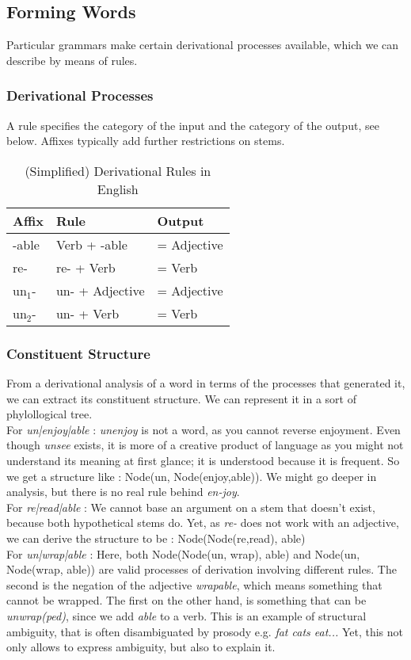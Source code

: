 \documentclass{cours}
\begin{document}
\subsection{Forming Words}
Particular grammars make certain derivational processes available, which we can describe by means of rules.

\subsubsection{Derivational Processes}
A rule specifies the category of the input and the category of the output, see below. Affixes typically add further restrictions on stems.

\begin{table}
    \centering
    \caption{(Simplified) Derivational Rules in English}
    \begin{tabular}{lll}
        \toprule
        Affix     & Rule            & Output      \\
        \midrule
        -able     & Verb + -able    & = Adjective \\
        re-       & re- + Verb      & = Verb      \\
        un$_{1}$- & un- + Adjective & = Adjective \\
        un$_{2}$- & un- + Verb      & = Verb      \\
    \end{tabular}
\end{table}

\subsubsection{Constituent Structure}
From a derivational analysis of a word in terms of the processes that generated it, we can extract its constituent structure. We can represent it in a sort of phylollogical tree. \\
For \textsl{un|enjoy|able}\! : \textsl{unenjoy} is not a word, as you cannot reverse enjoyment. Even though \textsl{unsee} exists, it is more of a creative product of language as you might not understand its meaning at first glance; it is understood because it is frequent. So we get a structure like\! : Node(un, Node(enjoy,able)). We might go deeper in analysis, but there is no real rule behind \textsl{en-joy}.\\
For \textsl{re|read|able}\! : We cannot base an argument on a stem that doesn't exist, because both hypothetical stems do. Yet, as \textsl{re-} does not work with an adjective, we can derive the structure to be\! : Node(Node(re,read), able)\\
For \textsl{un|wrap|able}\! : Here, both Node(Node(un, wrap), able) and Node(un, Node(wrap, able)) are valid processes of derivation involving different rules. The second is the negation of the adjective \textsl{wrapable}, which means something that cannot be wrapped. The first on the other hand, is something that can be \textsl{unwrap(ped)}, since we add \textsl{able} to a verb. This is an example of structural ambiguity, that is often disambiguated by prosody e.g. \textsl{fat cats eat...} Yet, this not only allows to express ambiguity, but also to explain it.
\end{document}

